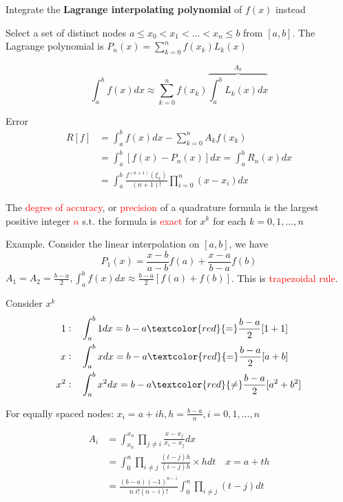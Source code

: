 \documentclass[11pt]{article}
\begin{document}
Integrate the \textbf{Lagrange interpolating polynomial} of \(f(x)\) instead

Select a set of distinct nodes \(a\le x_0<x_1<\dots<x_n\le b\) from \([a,b]\).
The Lagrange polynomial is \(P_n(x)=\displaystyle\sum_{k=0}^nf(x_k)L_k(x)\)

\begin{equation*}
\int_a^bf(x)dx\approx \displaystyle\sum_{k=0}^nf(x_k)
\overbrace{\int_a^b L_k(x)dx}^{A_k}
\end{equation*}

Error
\begin{align*}
R[f]&=\int_a^bf(x)dx-\displaystyle\sum_{k=0}^nA_kf(x_k)\\
&=\int_a^b[f(x)-P_n(x)]dx=\int_a^bR_n(x)dx\\
&=\int_a^b\frac{f^{(n+1)}(\xi_x)}{(n+1)!}\displaystyle\prod_{i=0}^n(x-x_i)dx
\end{align*}

\begin{definition}
The \textcolor{red}{degree of accuracy}, or \textcolor{red}{precision} of a quadrature
formula is the largest positive integer \textcolor{red}{$n$}   s.t. 
the formula is \textcolor{red}{exact}
for $x^k$ for each $k=0,1,\dots,n$
\end{definition}

Example. Consider the linear interpolation on \([a,b]\), we have 
\begin{equation*}
P_1(x)=\frac{x-b}{a-b}f(a)+\frac{x-a}{b-a}f(b)
\end{equation*}
\(A_1=A_2=\frac{b-a}{2}, \int_a^bf(x)dx\approx\frac{b-a}{2}[f(a)+f(b)]\). This
is \textcolor{red}{trapezoidal rule}.

Consider \(x^k\)
\begin{align*}
1:\quad &\int_a^b1dx=b-a \textcolor{red}{=} \frac{b-a}{2}[1+1]\\
x:\quad &\int_a^bxdx=b-a \textcolor{red}{=}\frac{b-a}{2}[a+b]\\
x^2:\quad &\int_a^bx^2dx=b-a \textcolor{red}{\neq}  \frac{b-a}{2}[a^2+b^2]\\
\end{align*}

For equally spaced nodes: \(x_i=a+ih,h=\frac{b-a}{n}, i=0,1,\dots,n\)

\begin{align*}
A_i&=\int_{x_0}^{x_n}\displaystyle\prod_{j\neq i}\frac{x-x_j}{x_i-x_j}dx\\
&=\int_0^n\displaystyle\prod_{i\neq j}\frac{(t-j)h}{(i-j)h}\times hdt\quad x=a+th\\
&=\frac{(b-a)(-1)^{n-i}}{n\;i!(n-i)!}\int_0^n\displaystyle\prod_{i\neq j}(t-j)dt
\end{align*}
\end{document}
